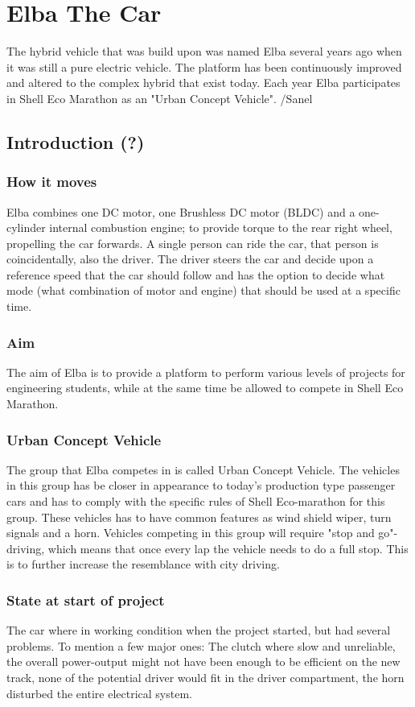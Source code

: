\chapter{Elba The Car}
The hybrid vehicle that was build upon was named Elba several years ago when it was still a pure electric vehicle. The platform has been continuously improved and altered to the complex hybrid that exist today. Each year Elba participates in Shell Eco Marathon as an "Urban Concept Vehicle". /Sanel

\section{Introduction (?)}
\subsection{How it moves}
Elba combines one DC motor, one Brushless DC motor (BLDC) and a one-cylinder internal combustion engine; to provide torque to the rear right wheel, propelling the car forwards.
A single person can ride the car, that person is coincidentally, also the driver. 
The driver steers the car and decide upon a reference speed that the car should follow and has the option to decide what mode (what combination of motor and engine) that should be used at a specific time.

\subsection{Aim}
The aim of Elba is to provide a platform to perform various levels of projects for engineering students, while at the same time be allowed to compete in Shell Eco Marathon.

\subsection{Urban Concept Vehicle}
The group that Elba competes in is called Urban Concept Vehicle. The vehicles in this group has be closer in appearance to today's production type passenger cars and has to comply with the specific rules of Shell Eco-marathon for this group. These vehicles has to have common features as wind shield wiper, turn signals and a horn. Vehicles competing in this group will require "stop and go"-driving, which means that once every lap the vehicle needs to do a full stop. This is to further increase the resemblance with city driving.

\subsection{State at start of project}
The car where in working condition when the project started, but had several problems. To mention a few major ones: The clutch where slow and unreliable, the overall power-output might not have been enough to be efficient on the new track, none of the potential driver would fit in the driver compartment, the horn disturbed the entire electrical system.

